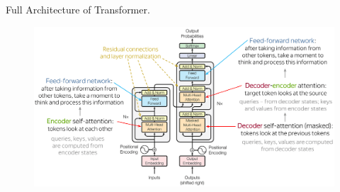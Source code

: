 \documentclass{beamer}
\begin{document}
\begin{frame}{Full Architecture of Transformer.}
    \begin{figure}
        \centering
        \includegraphics[width=1\linewidth]{f4.png}
        \label{fig:enter-label}
    \end{figure}
    \renewcommand{\thefootnote}{}
\renewcommand{\thefootnote}{\arabic{footnote}}

\end{frame}
\end{document}
